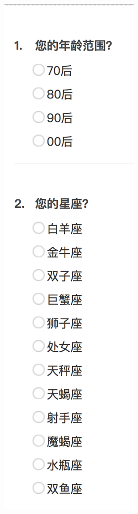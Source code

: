 \documentclass[UTF8]{article}
\begin{document}
\begin{figure}[H]
\begin{minipage}[t]{0.15\textwidth}
    \vspace{0pt}
    \includegraphics[width=\textwidth]{images/ques1.png}

\end{minipage}
\end{figure}
\end{document}
